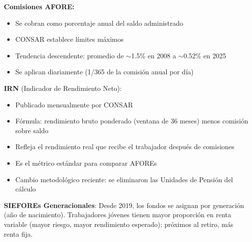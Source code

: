 \documentclass[11pt,a4paper]{report}
\begin{document}
\begin{tcolorbox}[colback=blue!5!white, colframe=blue!75!black, title=\textbf{Definici\'on Formal}]
\textbf{Comisiones AFORE:}
\begin{itemize}[nosep]
\item Se cobran como porcentaje anual del saldo administrado
\item CONSAR establece l\'imites m\'aximos
\item Tendencia descendente: promedio de $\sim$1.5\% en 2008 a $\sim$0.52\% en 2025
\item Se aplican diariamente (1/365 de la comisi\'on anual por d\'ia)
\end{itemize}

\textbf{IRN} (Indicador de Rendimiento Neto):
\begin{itemize}[nosep]
\item Publicado mensualmente por CONSAR
\item F\'ormula: rendimiento bruto ponderado (ventana de 36 meses) menos comisi\'on sobre saldo
\item Refleja el rendimiento real que recibe el trabajador despu\'es de comisiones
\item Es el m\'etrico est\'andar para comparar AFOREs
\item Cambio metodol\'ogico reciente: se eliminaron las Unidades de Pensi\'on del c\'alculo
\end{itemize}

\textbf{SIEFOREs Generacionales}: Desde 2019, los fondos se asignan por generaci\'on (a\~no de nacimiento). Trabajadores j\'ovenes tienen mayor proporci\'on en renta variable (mayor riesgo, mayor rendimiento esperado); pr\'oximos al retiro, m\'as renta fija.
\end{tcolorbox}
\end{document}
